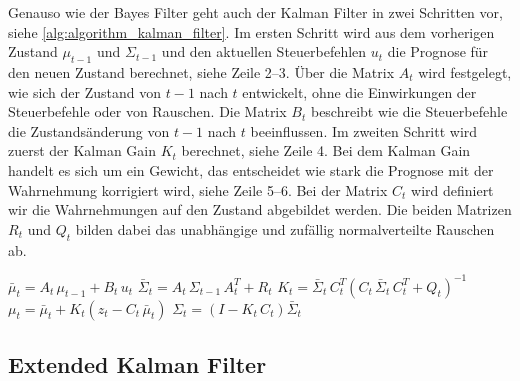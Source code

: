 Genauso wie der Bayes Filter geht auch der Kalman Filter in zwei Schritten vor, siehe \autoref{alg:algorithm_kalman_filter}. Im ersten Schritt wird aus dem vorherigen Zustand $\mu_{t-1}$ und $\Sigma_{t-1}$ und den aktuellen Steuerbefehlen $u_t$ die Prognose für den neuen Zustand berechnet, siehe Zeile 2--3. Über die Matrix $A_t$ wird festgelegt, wie sich der Zustand von $t-1$ nach $t$ entwickelt, ohne die Einwirkungen der Steuerbefehle oder von Rauschen. Die Matrix $B_t$ beschreibt wie die Steuerbefehle die Zustandsänderung von $t-1$ nach $t$ beeinflussen. Im zweiten Schritt wird zuerst der Kalman Gain $K_t$ berechnet, siehe Zeile 4. Bei dem Kalman Gain handelt es sich um ein Gewicht, das entscheidet wie stark die Prognose mit der Wahrnehmung korrigiert wird, siehe Zeile 5--6. Bei der Matrix $C_t$ wird definiert wir die Wahrnehmungen auf den Zustand abgebildet werden. Die beiden Matrizen $R_t$ und $Q_t$ bilden dabei das unabhängige und zufällig normalverteilte Rauschen ab.


\begin{algorithm}
\begin{onehalfspacing}
	\DontPrintSemicolon
	{
		$\bar{\mu}_t = A_t \, \mu_{t-1} + B_t \, u_t$\;
		$\bar{\Sigma}_t = A_t \, \Sigma_{t-1} \, A^T_t + R_t$\;
		\BlankLine
		\BlankLine
		$K_t = \bar{\Sigma}_t \, C^T_t (C_t \, \bar{\Sigma}_t \, C^T_t + Q_t)^{-1}$\;
		$\mu_t = \bar{\mu}_t + K_t (z_t - C_t \, \bar{\mu}_t)$\;
		$\Sigma_t = (I - K_t \, C_t) \bar{\Sigma}_t$\;
	}
\label{alg:algorithm_kalman_filter}
\end{onehalfspacing}
\end{algorithm}


%
%
%
\subsection{Extended Kalman Filter}

